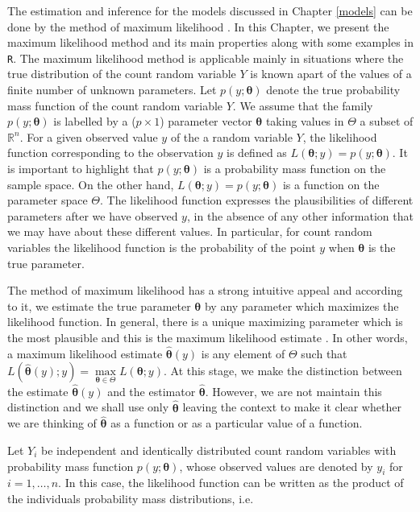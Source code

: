 \documentclass[9pt,a5paper,]{book}
\theoremstyle{definition}
\theoremstyle{definition}
\theoremstyle{remark}
\begin{document}
The estimation and inference for the models discussed in Chapter
\ref{models} can be done by the method of maximum likelihood
\citep{Silvey:1975}. In this Chapter, we present the maximum likelihood
method and its main properties along with some examples in \texttt{R}.
The maximum likelihood method is applicable mainly in situations where
the true distribution of the count random variable \(Y\) is known apart
of the values of a finite number of unknown parameters. Let
\(p(y;\boldsymbol{\theta})\) denote the true probability mass function
of the count random variable \(Y\). We assume that the family
\(p(y;\boldsymbol{\theta})\) is labelled by a (\(p \times 1\)) parameter
vector \(\boldsymbol{\theta}\) taking values in \(\Theta\) a subset of
\(\mathbb{R}^n\). For a given observed value \(y\) of the a random
variable \(Y\), the likelihood function corresponding to the observation
\(y\) is defined as
\(L(\boldsymbol{\theta};y) = p(y;\boldsymbol{\theta})\). It is important
to highlight that \(p(y;\boldsymbol{\theta})\) is a probability mass
function on the sample space. On the other hand,
\(L(\boldsymbol{\theta};y) = p(y;\boldsymbol{\theta})\) is a function on
the parameter space \(\Theta\). The likelihood function expresses the
plausibilities of different parameters after we have observed \(y\), in
the absence of any other information that we may have about these
different values. In particular, for count random variables the
likelihood function is the probability of the point \(y\) when
\(\boldsymbol{\theta}\) is the true parameter.

The method of maximum likelihood has a strong intuitive appeal and
according to it, we estimate the true parameter \(\boldsymbol{\theta}\)
by any parameter which maximizes the likelihood function. In general,
there is a unique maximizing parameter which is the most plausible and
this is the maximum likelihood estimate \citep{Silvey:1975}. In other
words, a maximum likelihood estimate \(\hat{\boldsymbol{\theta}}(y)\) is
any element of \(\Theta\) such that
\(L(\hat{\boldsymbol{\theta}}(y);y) = \underset{\boldsymbol{\theta}\in \Theta}\max L(\boldsymbol{\theta};y).\)
At this stage, we make the distinction between the estimate
\(\hat{\boldsymbol{\theta}}(y)\) and the estimator
\(\hat{\boldsymbol{\theta}}\). However, we are not maintain this
distinction and we shall use only \(\hat{\boldsymbol{\theta}}\) leaving
the context to make it clear whether we are thinking of
\(\hat{\boldsymbol{\theta}}\) as a function or as a particular value of
a function.

Let \(Y_i\) be independent and identically distributed count random
variables with probability mass function \(p(y;\boldsymbol{\theta})\),
whose observed values are denoted by \(y_i\) for \(i = 1, \ldots, n.\)
In this case, the likelihood function can be written as the product of
the individuals probability mass distributions, i.e.
\end{document}
